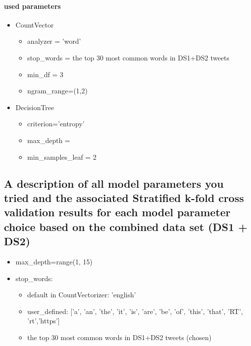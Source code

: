 \documentclass[11pt]{article}
\providecommand{\tightlist}{%
      \setlength{\itemsep}{0pt}\setlength{\parskip}{0pt}}
\begin{document}
    \paragraph{used parameters}\label{used-parameters}

\begin{itemize}
\tightlist
\item
  CountVector

  \begin{itemize}
  \tightlist
  \item
    analyzer = 'word'
  \item
    stop\_words = the top 30 most common words in DS1+DS2 tweets
  \item
    min\_df = 3
  \item
    ngram\_range=(1,2)
  \end{itemize}
\item
  DecisionTree

  \begin{itemize}
  \tightlist
  \item
    criterion='entropy'
  \item
    max\_depth =
  \item
    min\_samples\_leaf = 2
  \end{itemize}
\end{itemize}

    \subsection*{A description of all model parameters you tried and the
associated Stratified k-fold cross validation results for each model
parameter choice based on the combined data set (DS1 +
DS2)}\label{a-description-of-all-model-parameters-you-tried-and-the-associated-stratified-k-fold-cross-validation-results-for-each-model-parameter-choice-based-on-the-combined-data-set-ds1-ds2}

    \begin{itemize}
\tightlist
\item
  max\_depth=range(1, 15)
\item
  stop\_words:

  \begin{itemize}
  \tightlist
  \item
    default in CountVectorizer: 'english'
  \item
    user\_defined: {[}'a', 'an', 'the', 'it', 'is', 'are', 'be', 'of',
    'this', 'that', 'RT', 'rt','https'{]}
  \item
    the top 30 most common words in DS1+DS2 tweets (chosen)
  \end{itemize}
\end{itemize}
\end{document}
